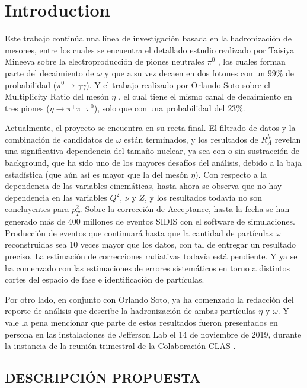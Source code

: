 \chapter{Introduction}

Este trabajo continúa una línea de investigación basada en la hadronización de mesones, entre los cuales se encuentra el detallado estudio realizado por Taisiya Mineeva sobre la electroproducción de piones neutrales $\pi^0$ \cite{tm}, los cuales forman parte del decaimiento de $\omega$ y que a su vez decaen en dos fotones con un $99\%$ de probabilidad ($\pi^0 \rightarrow \gamma \gamma$). Y el trabajo realizado por Orlando Soto sobre el Multiplicity Ratio del mesón $\eta$ \cite{os}, el cual tiene el mismo canal de decaimiento en tres piones ($\eta \rightarrow \pi^+ \pi^{-} \pi^0$), solo que con una probabilidad del $23\%$.

Actualmente, el proyecto se encuentra en su recta final. El filtrado de datos y la combinación de candidatos de $\omega$ están terminados, y los resultados de $R^h_A$ revelan una significativa dependencia del tamaño nuclear, ya sea con o sin sustracción de background, que ha sido uno de los mayores desafíos del análisis, debido a la baja estadística (que aún así es mayor que la del mesón $\eta$). Con respecto a la dependencia de las variables cinemáticas, hasta ahora se observa que no hay dependencia en las variables $Q^2$, $\nu$ y $Z$, y los resultados todavía no son concluyentes para $p_T^2$. Sobre la corrección de Acceptance, hasta la fecha se han generado más de 400 millones de eventos SIDIS con el software de simulaciones. Producción de eventos que continuará hasta que la cantidad de partículas $\omega$ reconstruidas sea 10 veces mayor que los datos, con tal de entregar un resultado preciso. La estimación de correcciones radiativas todavía está pendiente. Y ya se ha comenzado con las estimaciones de errores sistemáticos en torno a distintos cortes del espacio de fase e identificación de partículas.

Por otro lado, en conjunto con Orlando Soto, ya ha comenzado la redacción del reporte de análisis que describe la hadronización de ambas partículas $\eta$ y $\omega$. Y vale la pena mencionar que parte de estos resultados fueron presentados en persona en las instalaciones de Jefferson Lab el 14 de noviembre de 2019, durante la instancia de la reunión trimestral de la Colaboración CLAS \cite{pres}.

\section{DESCRIPCIÓN PROPUESTA}

